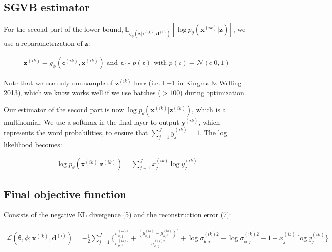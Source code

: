 \documentclass{article}
\begin{document}
\subsection{SGVB estimator}

For the second part of the lower bound, $\mathds{E}_{q_\phi(\mathbf{z}|\mathbf{x}^{(ik)},\mathbf{d}^{(i)})}[\log p_\theta (\mathbf{x}^{(ik)}|\mathbf{z})]$, we use a reparametrization of $\mathbf{z}$:

\begin{align} \mathbf{z}^{(ik)} = g_\phi(\mathbf{\epsilon}^{(ik)}, \mathbf{x}^{(ik)}) \text{    and    } \mathbf{\epsilon} 
 \sim p(\mathbf{\epsilon}) \text{   with  } p(\epsilon) = \mathcal{N}(\epsilon|0,1)
\end{align}

Note that we use only one sample of $\mathbf{z}^{(ik)}$ here (i.e. L=1 in Kingma \& Welling 2013), which we know works well if we use batches ($>100$) during optimization.

Our estimator of the second part is now $\log p_\theta (\mathbf{x}^{(ik)}|\mathbf{z}^{(ik)})$, which is a multinomial. We use a softmax in the final layer to output $\mathbf{y}^{(ik)}$, which represents the word probabilities, to ensure that $\sum\limits_{j=1}^J y_j^{(ik)} = 1$. The log likelihood becomes: 

\begin{align}
\log p_\theta (\mathbf{x}^{(ik)}|\mathbf{z}^(ik)) = \sum\limits_{j=1}^{J}x_j^{(ik)}\log y_j^{(ik)}
\end{align}

\subsection{Final objective function}

Consists of the negative KL divergence (5) and the reconstruction error (7):

\begin{align}
\mathcal{L}(\mathbf{\theta}, \phi; \mathbf{x}^{(ik)},
 \mathbf{d}^{(i)}) = - \frac{1}{2}
 \sum\limits_{j=1}^{J}\{
 \frac{\sigma_{\phi,j}^{(ik)2}}	{\sigma_{\theta,j}^{(ik)2}} 
 + \frac{(\mu_{\phi,j}^{(ik)} - \mu_{\theta,j}^{(ik)})^{2}}		{\sigma_{\phi,j}^{(ik)2}} 
 + \log  \sigma_{\theta,j}^{(ik)2} - \log \sigma_{\phi,j}^{(ik)2}
   - 1 - x_j^{(ik)}\log y_j^{(ik)} \}
\end{align}
\end{document}
